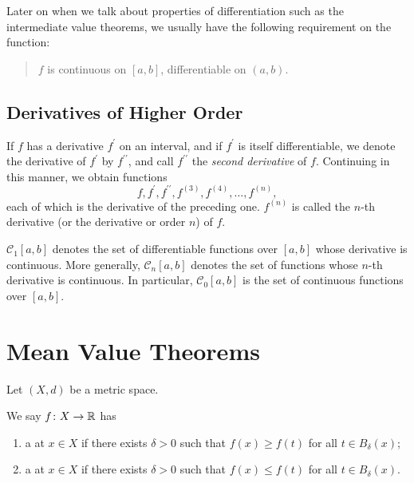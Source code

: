 Later on when we talk about properties of differentiation such as the intermediate value theorems, we usually have the following requirement on the function:
\begin{quote}
$f$ is continuous on $[a,b]$, differentiable on $(a,b)$.
\end{quote}
\pagebreak

\subsection{Derivatives of Higher Order}
If $f$ has a derivative $f^\prime$ on an interval, and if $f^\prime$ is itself differentiable, we denote the derivative of $f^\prime$ by $f^{\prime\prime}$, and call $f^{\prime\prime}$ the \emph{second derivative} of $f$. Continuing in this manner, we obtain functions
\[f,f^\prime,f^{\prime\prime},f^{(3)},f^{(4)},\dots,f^{(n)},\]
each of which is the derivative of the preceding one. $f^{(n)}$ is called the $n$-th derivative (or the derivative or order $n$) of $f$.

\begin{notation}
$\mathcal{C}_1[a,b]$ denotes the set of differentiable functions over $[a,b]$ whose derivative is continuous. More generally, $\mathcal{C}_n[a,b]$ denotes the set of functions whose $n$-th derivative is continuous. In particular, $\mathcal{C}_0[a,b]$ is the set of continuous functions over $[a,b]$.
\end{notation}
\pagebreak

\section{Mean Value Theorems}
Let $(X,d)$ be a metric space.

\begin{definition}
We say $f\colon X\to\mathbb R$ has
\begin{enumerate}[label=(\roman*)]
\item a  at $x\in X$ if there exists $\delta>0$ such that $f(x)\ge f(t)$ for all $t\in B_\delta(x)$;
\item a  at $x\in X$ if there exists $\delta>0$ such that $f(x)\le f(t)$ for all $t\in B_\delta(x)$.
\end{enumerate}
\end{definition}

